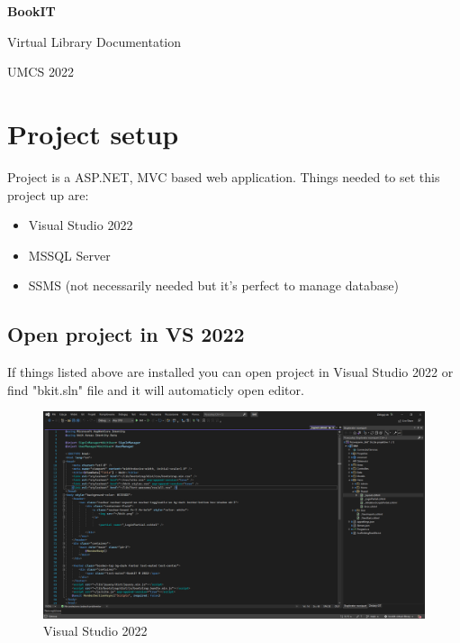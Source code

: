 \documentclass[a4paper,12pt,oneside]{article}
\begin{document}
	
	\begin{titlepage}
		\begin{center}
			\vspace*{1cm}
			
			\Huge
			\textbf{BookIT}
			
			\vspace{0.5cm}
			\LARGE
			Virtual Library Documentation
	
			
			\vfill
			\vspace{0.8cm}
			
			\Large
			UMCS 2022
			
		\end{center}
	\end{titlepage}
	
	\section{Project setup}
	
	Project is a ASP.NET, MVC based web application. Things needed to set this project up are:
	
	\begin{itemize}
		\item Visual Studio 2022
		\item MSSQL Server
		\item SSMS (not necessarily needed but it's perfect to manage database)
	\end{itemize}

	\subsection{Open project in VS 2022}
	If things listed above are installed you can open project in Visual Studio 2022 or find "bkit.sln" file and it will automaticly open editor.
	
	\begin{figure}[h]
		\centering
		\includegraphics[width=1\textwidth]{img/vsstudio}
		\caption{Visual Studio 2022}
	\end{figure}
\end{document}
